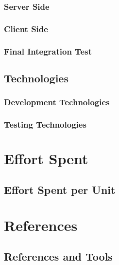 \documentclass[a4paper,12pt]{article}
\begin{document}
\subsubsection{Server Side}
\subsubsection{Client Side}
\subsubsection{Final Integration Test}
\subsection{Technologies}
\subsubsection{Development Technologies}
\subsubsection{Testing Technologies}

\section{Effort Spent}
\subsection{Effort Spent per Unit}

\section{References}
\subsection{References and Tools}
\end{document}
